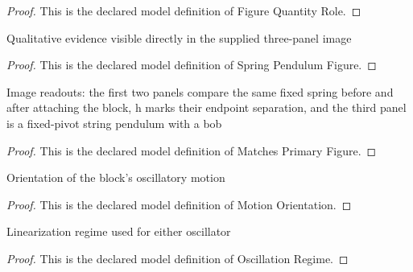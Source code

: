 \begin{proof}
  This is the declared model definition of Figure Quantity Role.
\end{proof}
\begin{definition}
  \label{def:physics:phyx-mini-0281:phyxminiproblems-problemphyxmini0281-springpendulumfigure}
  Qualitative evidence visible directly in the supplied three-panel image
\end{definition}
\begin{proof}
  This is the declared model definition of Spring Pendulum Figure.
\end{proof}
\begin{definition}
  \label{def:physics:phyx-mini-0281:phyxminiproblems-problemphyxmini0281-matchesprimaryfigure}
  Image readouts: the first two panels compare the same fixed spring before and after attaching the block, h marks their endpoint separation, and the third panel is a fixed-pivot string pendulum with a bob
\end{definition}
\begin{proof}
  This is the declared model definition of Matches Primary Figure.
\end{proof}
\begin{definition}
  \label{def:physics:phyx-mini-0281:phyxminiproblems-problemphyxmini0281-motionorientation}
  Orientation of the block's oscillatory motion
\end{definition}
\begin{proof}
  This is the declared model definition of Motion Orientation.
\end{proof}
\begin{definition}
  \label{def:physics:phyx-mini-0281:phyxminiproblems-problemphyxmini0281-oscillationregime}
  Linearization regime used for either oscillator
\end{definition}
\begin{proof}
  This is the declared model definition of Oscillation Regime.
\end{proof}
